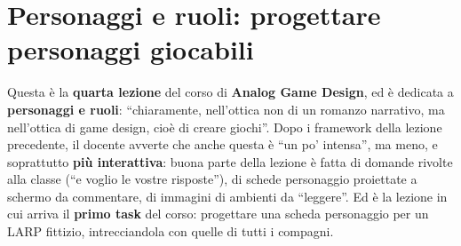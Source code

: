 %
%
%    
%    
%    
%    
%

\chapter[Personaggi e ruoli]{Personaggi e ruoli: progettare personaggi
giocabili}
\label{a4:cap:personaggi}

Questa è la \textbf{quarta lezione} del corso di \textbf{Analog Game Design}, ed
è dedicata a \textbf{personaggi e ruoli}: ``chiaramente, nell'ottica non di un
romanzo narrativo, ma nell'ottica di game design, cioè di creare giochi''. Dopo i
framework della lezione precedente, il docente avverte che anche questa è ``un po'
intensa'', ma meno, e soprattutto \textbf{più interattiva}: buona parte della
lezione è fatta di domande rivolte alla classe (``e voglio le vostre risposte''),
di schede personaggio proiettate a schermo da commentare, di immagini di ambienti
da ``leggere''. Ed è la lezione in cui arriva il \textbf{primo task} del corso:
progettare una scheda personaggio per un LARP fittizio, intrecciandola con quelle
di tutti i compagni.

